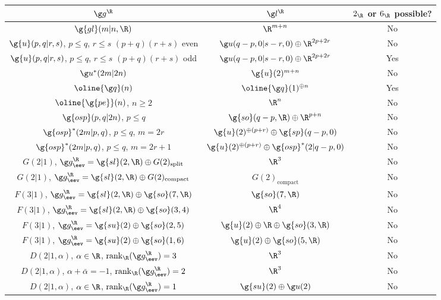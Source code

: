 \documentclass[12pt]{amsart}
\renewcommand{\arraystretch}{1.2}
\begin{document}
\begin{table}[ht]
\renewcommand{\arraystretch}{1.4}
\begin{tabular}{|c|c|c|}
\hline
$\g g^\R$ & $\g l^\R$ & \makecell{$2_\R$ or $6_\R$\\ possible?}\\
\hline 
$\g{gl}(m|n,\R)$ & $\R^{m+n}$ & No\\

\hline 
\makecell{$\g{u}(p,q|r,s)$, $p\leq q$, $r\leq s$\\ $(p+q)(r+s)$ even} & $\g u(q-p,0|s-r,0)\oplus \R^{2p+2r}$ & No\\

\hline 
\makecell{$\g{u}(p,q|r,s)$, $p\leq q$, $r\leq s$\\ $(p+q)(r+s)$ odd} & $\g u(q-p,0|s-r,0)\oplus \R^{2p+2r}$ & Yes\\

\hline $\g u^*(2m|2n)$ & $\g{u}(2)^{m+n}$ & No\\

\hline $\oline{\g q}(n)$ &  $\oline{\g q}(1)^{\oplus n}$ & Yes\\

\hline 
$\oline{\g{pe}}(n)$, $n\geq 2$ & $\R^{n}$ & No\\

\hline 
$\g{osp}(p,q|2n)$, $p\leq q$ & $\g{so}(q-p,\R)\oplus \R^{p+n}$ & No\\

\hline 
$\g{osp}^*(2m|p,q)$, $p\leq q$, $m=2r$ & $\g{u}(2)^{\oplus (p+r)}\oplus \g{sp}(q-p,0)$ & No\\
\hline $\g{osp}^*(2m|p,q)$, $p\leq q$, $m=2r+1$ & $\g{u}(2)^{\oplus (p+r)}\oplus \g{osp}^*(2|q-p,0)$ & No\\
\hline 
$G(2|1)$, $\g g_\eev^\R=\g{sl}(2,\R)\oplus G(2)_\mathrm{split}$ & $\R^3$ & No\\
\hline 
$G(2|1)$, $\g g_\eev^\R=\g{sl}(2,\R)\oplus G(2)_\mathrm{compact}$ & $G(2)_\mathrm{compact}$ & No\\
\hline 
$F(3|1)$, $\g g_\eev^\R=\g{sl}(2,\R)\oplus\g{so}(7,\R)$ & $\g{so}(7,\R)$& No \\
\hline 
$F(3|1)$, $\g g_\eev^\R=\g{sl}(2,\R)\oplus\g{so}(3,4)$ & $\R^4$& No\\
\hline 
$F(3|1)$, $\g g_\eev^\R=\g{su}(2)\oplus \g{so}(2,5)$ & $\g{u}(2)\oplus \R\oplus \g{so}(3,\R)$& No\\
\hline 
$F(3|1)$, $\g g_\eev^\R=\g{su}(2)\oplus \g{so}(1,6)$ & $\g{u}(2)\oplus \g{so}(5,\R)$& No\\
\hline 
$D(2|1,\alpha)$, $\alpha\in\R$, $\mathrm{rank}_\R(\g g_\eev^\R)=3$ & $\R^3$& No\\
\hline   
$D(2|1,\alpha)$, $\alpha+\bar \alpha=-1$, $\mathrm{rank}_\R(\g g_\eev^\R)=2$ & $\R^3$& No\\
\hline 
$D(2|1,\alpha)$, $\alpha\in\R$, $\mathrm{rank}_\R(\g g_\eev^\R)=1$ & $\g{su}(2)\oplus \g u(2)$& No\\
\hline 
\end{tabular}
\vspace{3mm}


\end{table}
\end{document}

